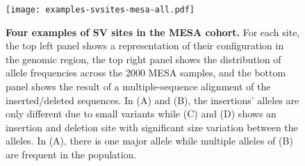 \documentclass[11pt]{ucscthesis}
\begin{document}
\begin{figure}[p]
  \centering



  \texttt{[image: examples-svsites-mesa-all.pdf]}
  \caption[Four examples of SV sites in the MESA cohort]{{\bf Four examples of SV sites in the MESA cohort.}
    For each site, the top left panel shows a representation of their configuration in the genomic region, the top right panel shows the distribution of allele frequencies across the 2000 MESA samples, and the bottom panel shows the result of a multiple-sequence alignment of the inserted/deleted sequences.
    In (A) and (B), the insertions' alleles are only different due to small variants while (C) and (D) shows an insertion and deletion site with significant size variation between the alleles.
    In (A), there is one major allele while multiple alleles of (B) are frequent in the population. }
  \label{fig:mesa-svsite-examples}
\end{figure}
\end{document}
